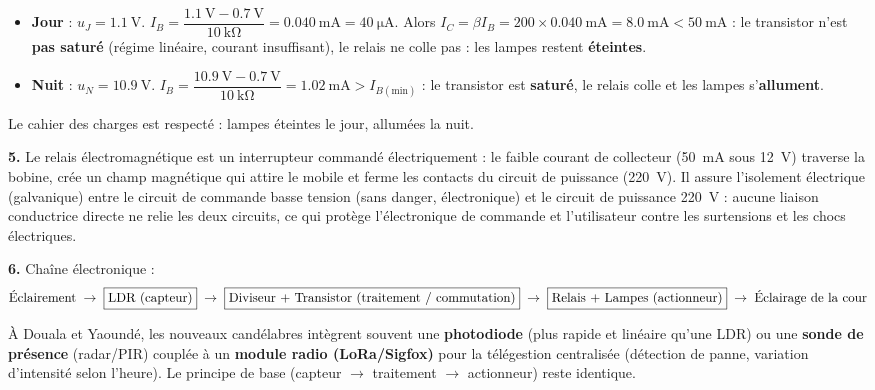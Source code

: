 \documentclass[11pt]{article}
\newcommand{\cle}[1]{{\popxbold\color{popdark}#1}}
\begin{document}
\begin{corrige}
\begin{itemize}
\item \textbf{Jour} : $u_J = \SI{1,1}{\volt}$. $I_B = \dfrac{\SI{1,1}{\volt} - \SI{0,7}{\volt}}{\SI{10}{\kilo\ohm}} = \SI{0,040}{\milli\ampere} = \SI{40}{\micro\ampere}$. Alors $I_C = \beta I_B = 200 \times \SI{0,040}{\milli\ampere} = \SI{8,0}{\milli\ampere} < \SI{50}{\milli\ampere}$ : le transistor n'est \textbf{pas saturé} (régime linéaire, courant insuffisant), le relais ne colle pas : les lampes restent \textbf{éteintes}.
\item \textbf{Nuit} : $u_N = \SI{10,9}{\volt}$. $I_B = \dfrac{\SI{10,9}{\volt} - \SI{0,7}{\volt}}{\SI{10}{\kilo\ohm}} = \SI{1,02}{\milli\ampere} > I_{B(\text{min})}$ : le transistor est \textbf{saturé}, le relais colle et les lampes s'\textbf{allument}.
\end{itemize}
Le cahier des charges est respecté : lampes éteintes le jour, allumées la nuit.

\textbf{5.} Le \cle{relais électromagnétique} est un interrupteur commandé électriquement : le faible courant de collecteur (\SI{50}{\milli\ampere} sous \SI{12}{\volt}) traverse la bobine, crée un champ magnétique qui attire le mobile et ferme les contacts du circuit de puissance (\SI{220}{\volt}). Il assure l'\cle{isolement électrique (galvanique)} entre le circuit de commande basse tension (sans danger, électronique) et le circuit de puissance \SI{220}{\volt} : aucune liaison conductrice directe ne relie les deux circuits, ce qui protège l'électronique de commande et l'utilisateur contre les surtensions et les chocs électriques.

\textbf{6.} Chaîne électronique :
\[
\text{Éclairement} \;\rightarrow\; \fbox{LDR (capteur)} \;\rightarrow\; \fbox{Diviseur + Transistor (traitement / commutation)} \;\rightarrow\; \fbox{Relais + Lampes (actionneur)} \;\rightarrow\; \text{Éclairage de la cour}
\]
\end{corrige}

\begin{savaistu}
À Douala et Yaoundé, les nouveaux candélabres intègrent souvent une \textbf{photodiode} (plus rapide et linéaire qu'une LDR) ou une \textbf{sonde de présence} (radar/PIR) couplée à un \textbf{module radio (LoRa/Sigfox)} pour la télégestion centralisée (détection de panne, variation d'intensité selon l'heure). Le principe de base (capteur $\rightarrow$ traitement $\rightarrow$ actionneur) reste identique.
\end{savaistu}
\end{document}
